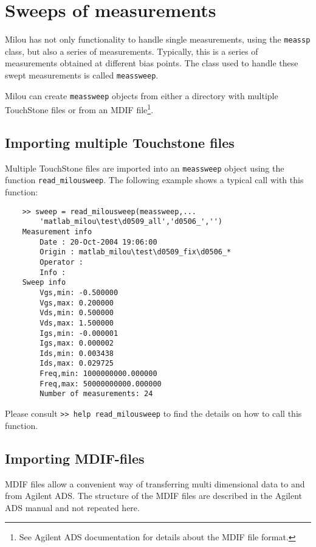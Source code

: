 %
%

\section{Sweeps of measurements}\label{sec:sweeps}
Milou has not only functionality to handle single measurements,
using the \verb"meassp" class, but also a series of measurements.
Typically, this is a series of measurements obtained at different
bias points. The class used to handle these swept measurements is
called \verb"meassweep".

Milou can create \verb"meassweep" objects from either a directory
with multiple TouchStone files or from an MDIF file\footnote{See
Agilent ADS documentation for details about the MDIF file
format.}.

\subsection{Importing multiple Touchstone files}
Multiple TouchStone files are imported into an \verb"meassweep"
object using the function \verb"read_milousweep". The following
example shows a typical call with this function:
\begin{small}
\begin{verbatim}
    >> sweep = read_milousweep(meassweep,...
        'matlab_milou\test\d0509_all','d0506_','')
    Measurement info
        Date : 20-Oct-2004 19:06:00
        Origin : matlab_milou\test\d0509_fix\d0506_*
        Operator :
        Info :
    Sweep info
        Vgs,min: -0.500000
        Vgs,max: 0.200000
        Vds,min: 0.500000
        Vds,max: 1.500000
        Igs,min: -0.000001
        Igs,max: 0.000002
        Ids,min: 0.003438
        Ids,max: 0.029725
        Freq,min: 1000000000.000000
        Freq,max: 50000000000.000000
        Number of measurements: 24
\end{verbatim}
\end{small}
Please consult \verb">> help read_milousweep" to find the details
on how to call this function.

\subsection{Importing MDIF-files}
MDIF files allow a convenient way of transferring multi
dimensional data to and from Agilent ADS. The structure of the
MDIF files are described in the Agilent ADS manual and not
repeated here.

